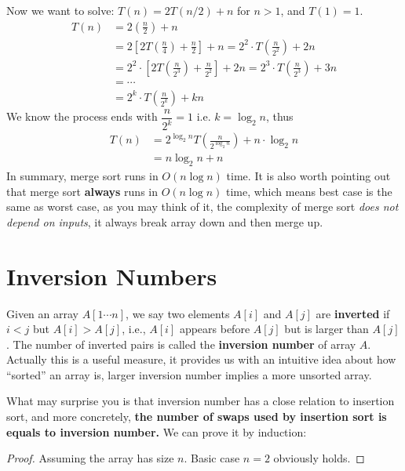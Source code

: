 \begin{spacing}{1.3}
    Now we want to solve: 
    $T(n)=2T(n/2)+n$ for $n>1$, and $T(1)=1$.
    \begin{align*}
        T(n) &= 2\left(\frac{n}{2}\right)+n\\
             &= 2\left[ 2T\left(\frac{n}{4}\right) +\frac{n}{2}\right] + n
              = 2^2\cdot T\left(\frac{n}{2^2}\right) +2n\\
             &= 2^2\cdot \left[ 2T\left(\frac{n}{2^3}\right) +\frac{n}{2^2}\right] + 2n
              = 2^3\cdot T\left(\frac{n}{2^3}\right) +3n\\
             &= \cdots\\
             &= 2^{k}\cdot T\left(\frac{n}{2^k}\right) +kn
    \end{align*}
    We know the process ends with $\dfrac{n}{2^k}=1$ i.e. $k=\log_2 n$, thus
    \begin{align*}
        T(n) &= 2^{\log_2 n}T\left(\frac{n}{2^{\log_2 n}}\right)+n\cdot \log_2 n\\
             &= n\log_2 n+n
    \end{align*}
    In summary, merge sort runs in $O(n\log n)$ time.
    It is also worth pointing out that merge sort {\bf always}
    runs in $O(n\log n)$ time, which means best case is the same 
    as worst case, as you may think of it, 
    the complexity of merge sort {\it does not depend on inputs},
    it always break array down and then merge up.

    \newpage
    \section{Inversion Numbers}

    Given an array $A[1\cdots n]$, we say two elements $A[i]$ and $A[j]$
    are {\bf inverted} if $i<j$ but $A[i]>A[j]$, i.e., $A[i]$ appears
    before $A[j]$ but is larger than $A[j]$. The number of inverted pairs
    is called the {\bf inversion number} of array $A$. 
    Actually this is a useful measure, it provides us with an intuitive
    idea about how ``sorted'' an array is, larger inversion number implies
    a more unsorted array.

    What may surprise you is that inversion number has a close relation
    to insertion sort, and more concretely, {\bf the number of swaps
    used by insertion sort is equals to inversion number.}
    We can prove it by induction:
    
    \begin{proof}
        Assuming the array has size $n$. Basic case
        $n=2$ obviously holds.


\end{proof}
\end{spacing}
